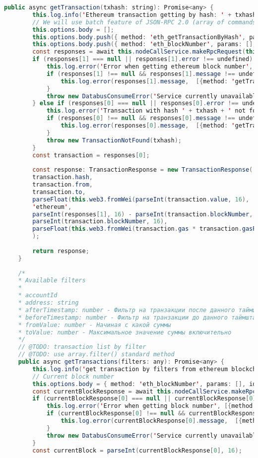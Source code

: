 \begin{lstlisting}[language=java]
	public async getTransaction(txhash: string): Promise<any> {
		this.log.info('Ethereum transaction getting by hash: ' + txhash);
		// We will use batch feature of JSON-RPC 2.0 (array of commands in body)
		this.options.body = [];
		this.options.body.push({ method: 'eth_getTransactionByHash', params: [txhash], id: '777'  });
		this.options.body.push({ method: 'eth_blockNumber', params: [], id: '777'  });
		const responses = await this.nodeCallService.makeRpcRequest(this.options);
		if (responses[1] === null || responses[1].error !== undefined) {
			this.log.error('Error when getting ethereum block number', [{method: 'getTransaction'}]);
			if (responses[1] !== null && responses[1].message !== undefined) {
				this.log.error(responses[1].message,  [{method: 'getTransaction'}]);
			}
			throw new DatabusConsumeError('Service currently unavailable');
		} else if (responses[0] === null || responses[0].error !== undefined) {
			this.log.error('Transaction with hash ' + txhash + ' not found on ethereum', [{method: 'getTransaction'}]);
			if (responses[0] !== null && responses[0].message !== undefined) {
				this.log.error(responses[0].message,  [{method: 'getTransaction'}]);
			}
			throw new TransactionNotFound(txhash);
		}
		const transaction = responses[0];
		
		const response: TransactionResponse = new TransactionResponse(
		transaction.hash,
		transaction.from,
		transaction.to,
		parseFloat(this.web3.fromWei(parseInt(transaction.value, 16), 'ether')),
		'ethereum',
		parseInt(responses[1], 16) - parseInt(transaction.blockNumber, 16),
		parseInt(transaction.blockNumber, 16),
		parseFloat(this.web3.fromWei(transaction.gas * transaction.gasPrice, 'ether').toString())
		);
		
		return response;
	}
	
	/*
	* Available filters
	*
	* accountId
	* address: string
	* afterTimestamp: number - Фильтр на транзакции после данного таймштампа
	* beforeTimestamp: number - Фильтр на транзакции до данного таймштампа
	* fromValue: number - Начиная с какой суммы
	* toValue: number - Максимальное значение суммы включительно
	*/
	// @TODO: transaction list by filter
	// @TODO: use array.filter() standard method
	public async getTransactions(filters: any): Promise<any> {
		this.log.info('get transaction by filters from ethereum blockchain');
		// Current block number
		this.options.body = { method: 'eth_blockNumber', params: [], id: '777'  };
		const currentBlockResponse = await this.nodeCallService.makeRpcRequest(this.options);
		if (currentBlockResponse[0] === null || currentBlockResponse[0].error !== undefined) {
			this.log.error('Error when getting block number', [{method: 'getTransactions'}]);
			if (currentBlockResponse[0] !== null && currentBlockResponse[0].message !== undefined) {
				this.log.error(currentBlockResponse[0].message,  [{method: 'getTransactions'}]);
			}
			throw new DatabusConsumeError('Service currently unavailable');
		}
		const currentBlock = parseInt(currentBlockResponse[0], 16);
		

\end{lstlisting}
